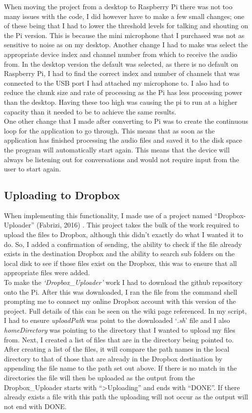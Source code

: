 \documentclass[a4paper,11pt]{report}
\begin{document}
When moving the project from a desktop to Raspberry Pi there was not too many issues with the code, I did however have to make a few small changes; one of these being that I had to lower the threshold levels for talking and shouting on the Pi version. This is because the mini microphone that I purchased was not as sensitive to noise as on my desktop. Another change I had to make was select the appropriate device index and channel number from which to receive the audio from. In the desktop version the default  was selected, as there is no default on Raspberry Pi, I had to find the correct index and number of channels that was connected to the USB port I had attached my microphone to. I also had to reduce the chunk size and rate of processing as the Pi has less processing power than the desktop. Having these too high was causing the pi to run at a higher capacity than it needed to be to achieve the same results.\\

One other change that I made after converting to Pi was to create the continuous loop for the application to go through. This means that as soon as the application has finished processing the audio files and saved it to the disk space the program will automatically start again. This means that the device will always be listening out for conversations and would not require input from the user to start again.

\subsection{Uploading to Dropbox}
When implementing this functionality, I made use of a project named “Dropbox-Uploader” (Fabrizi, 2016) . This project takes the bulk of the work required to upload the files to Dropbox, although this didn’t exactly do what I wanted it to do. So, I added a confirmation of sending, the ability to check if the file already exists in the destination Dropbox and the ability to search sub folders on the local disk to see if those files exist on the Dropbox, this was to ensure that all appropriate files were added. \\

To make the \textit{‘Dropbox\_Uploader’} work I had to download the github repository onto the Pi. After this was downloaded, I ran the file from the command shell prompting me to connect my online Dropbox account with this version of the project. Full details of this can be seen on the wiki page referenced. In my script, I had to ensure \textit{uploadPath} was point to the downloaded ‘\textit{.sh}’ file and I also \textit{homeDirectory} was pointing to the directory that I wanted to upload my files from. Next, I created a list of files that are in the directory being pointed to. After creating a list of the files, it will compare the path names in the local directory to that of those that are already in the Dropbox destination by appending the file name to the path set out above. If there is no match in the directories the file will then be uploaded as the output from the Dropbox\_Uploader starts with “>Uploading” and ends with “DONE”. If there already exists a file with this path the uploading will not occur as the output will not end with DONE.\\
\end{document}
